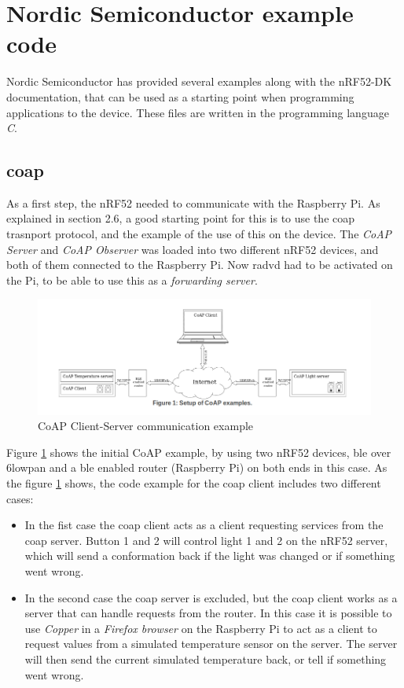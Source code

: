 \section{Nordic Semiconductor example code}

Nordic Semiconductor has provided several examples along with the nRF52-DK documentation, that can be used as a starting point when programming applications to the device. These files are written in the programming language \textit{C}. 

\subsection{\gls{coap}}

As a first step, the nRF52 needed to communicate with the Raspberry Pi. As explained in section 2.6, a good starting point for this is to use the \gls{coap} trasnport protocol, and the example of the use of this on the device. The \textit{CoAP Server} and \textit{CoAP Observer} was loaded into two different nRF52 devices, and both of them connected to the Raspberry Pi. Now \gls{radvd} had to be activated on the Pi, to be able to use this as a \textit{forwarding server}. 

\begin{figure}[ht]
    \centering
    \includegraphics[scale=0.47]{CoAPExample.png}    
    \caption{CoAP Client-Server communication example}
    \label{fig:CoAPexample1}
\end{figure}

Figure \ref{fig:CoAPexample1} shows the initial CoAP example, by using two nRF52 devices, \gls{ble} over \gls{6lowpan} and a \gls{ble} enabled router (Raspberry Pi) on both ends in this case. As the figure \ref{fig:CoAPexample1} shows, the code example for the \gls{coap} client includes two different cases: 

\begin{itemize}
  \item In the fist case the \gls{coap} client acts as a client requesting services from the \gls{coap} server. Button 1 and 2 will control light 1 and 2 on the nRF52 server, which will send a conformation back if the light was changed or if something went wrong.
  \item In the second case the \gls{coap} server is excluded, but the \gls{coap} client works as a server that can handle requests from the router. In this case it is possible to use \textit{Copper} in a \textit{Firefox browser} on the Raspberry Pi to act as a client to request values from a simulated temperature sensor on the server. The server will  then send the current simulated temperature back, or tell if something went wrong. 
\end{itemize} 

